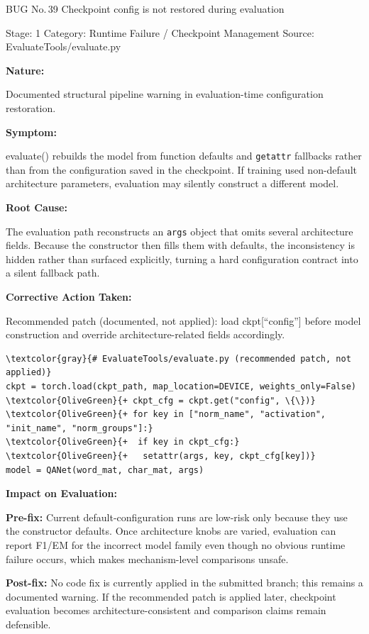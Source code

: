 \documentclass[10pt]{article}
\newcommand{\FieldLabel}[1]{%
 {\bfseries #1:}\par
}
\begin{document}
\begin{rednotebugbox}{BUG No.\,39 \quad Checkpoint config is not restored during evaluation}
{\color{MetaGray}\small Stage: 1 \;\textbar\; Category: Runtime Failure / Checkpoint Management \;\textbar\; Source: EvaluateTools/evaluate.py\par}
\vspace{0.22em}
\FieldLabel{Nature}
Documented structural pipeline warning in evaluation-time configuration restoration.
\par
\vspace{0.35em}
\FieldLabel{Symptom}
evaluate() rebuilds the model from function defaults and \texttt{getattr} fallbacks rather than from the configuration saved in the checkpoint. If training used non-default architecture parameters, evaluation may silently construct a different model.
\par
\vspace{0.35em}
\FieldLabel{Root Cause}
The evaluation path reconstructs an \texttt{args} object that omits several architecture fields. Because the constructor then fills them with defaults, the inconsistency is hidden rather than surfaced explicitly, turning a hard configuration contract into a silent fallback path.
\par
\vspace{0.35em}
\FieldLabel{Corrective Action Taken}
Recommended patch (documented, not applied): load ckpt{[}``config''{]} before model construction and override architecture-related fields accordingly.
\par
\vspace{0.35em}
\begin{Verbatim}[commandchars=\\\{\},fontsize=\footnotesize,breaklines=true,breaksymbol={},frame=leftline,framerule=2pt,rulecolor=\color{gray!40},xleftmargin=6pt,formatcom=\singlespacing]
\textcolor{gray}{# EvaluateTools/evaluate.py (recommended patch, not applied)}
ckpt = torch.load(ckpt_path, map_location=DEVICE, weights_only=False)
\textcolor{OliveGreen}{+ ckpt_cfg = ckpt.get("config", \{\})}
\textcolor{OliveGreen}{+ for key in ["norm_name", "activation", "init_name", "norm_groups"]:}
\textcolor{OliveGreen}{+  if key in ckpt_cfg:}
\textcolor{OliveGreen}{+   setattr(args, key, ckpt_cfg[key])}
model = QANet(word_mat, char_mat, args)
\end{Verbatim}
\vspace{0.22em}
\FieldLabel{Impact on Evaluation}
\textbf{Pre-fix:} Current default-configuration runs are low-risk only because they use the constructor defaults. Once architecture knobs are varied, evaluation can report F1/EM for the incorrect model family even though no obvious runtime failure occurs, which makes mechanism-level comparisons unsafe.\par\smallskip
\textbf{Post-fix:} No code fix is currently applied in the submitted branch; this remains a documented warning. If the recommended patch is applied later, checkpoint evaluation becomes architecture-consistent and comparison claims remain defensible.
\par
\vspace{0.35em}
\end{rednotebugbox}
\end{document}
